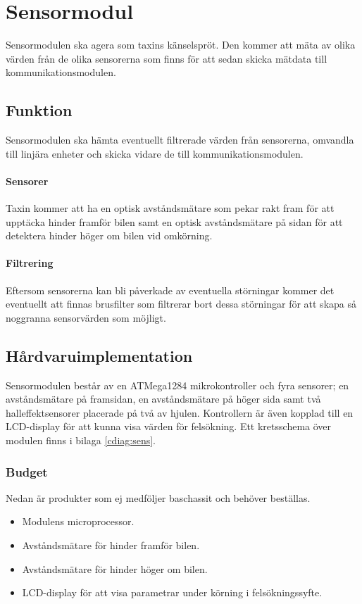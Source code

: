 \documentclass[designspec/spec.tex]{subfiles}
\begin{document}
\section{Sensormodul}
Sensormodulen ska agera som taxins känselspröt. Den kommer att mäta av olika
värden från de olika sensorerna som finns för att sedan skicka mätdata till
kommunikationsmodulen.

\subsection{Funktion}
Sensormodulen ska hämta eventuellt filtrerade värden från sensorerna, omvandla
till linjära enheter och skicka vidare de till kommunikationsmodulen.

\paragraph{Sensorer}
Taxin kommer att ha en optisk avståndsmätare som pekar rakt fram för att
upptäcka hinder framför bilen samt en optisk avståndsmätare på sidan för att
detektera hinder höger om bilen vid omkörning.

\paragraph{Filtrering}
Eftersom sensorerna kan bli påverkade av eventuella störningar kommer det
eventuellt att finnas brusfilter som filtrerar bort dessa störningar för att
skapa så noggranna sensorvärden som möjligt.

\subsection{Hårdvaruimplementation} 
Sensormodulen består av en ATMega1284 mikrokontroller och fyra sensorer; en
avståndsmätare på framsidan, en avståndsmätare på höger sida samt två
halleffektsensorer placerade på två av hjulen. Kontrollern är även kopplad till
en LCD-display för att kunna visa värden för felsökning. Ett kretsschema över
modulen finns i bilaga \ref{cdiag:sens}.

\subsubsection{Budget}
Nedan är produkter som ej medföljer baschassit och behöver beställas.
\begin{itemize}
	\item \textbf{\modMicrocontroller} Modulens microprocessor. 
    \item \textbf{\modDistf} Avståndsmätare för hinder framför bilen.
    \item \textbf{\modDists} Avståndsmätare för hinder höger om bilen.
    \item \textbf{\modLcd} LCD-display för att visa parametrar under körning
    i felsökningssyfte.
\end{itemize}
\end{document}
